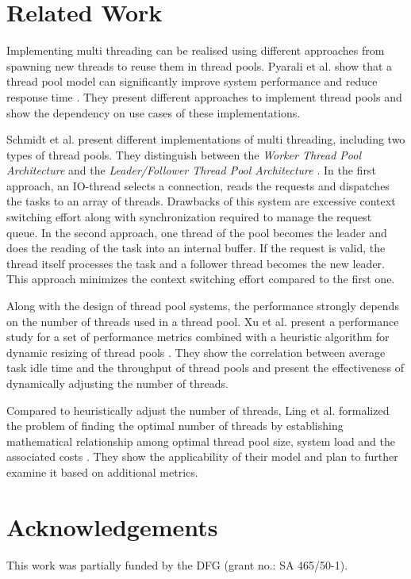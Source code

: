 \documentclass[conference]{IEEEtran}
\begin{document}
\section{Related Work}
Implementing multi threading can be realised using different approaches from spawning new threads to reuse them in thread pools. Pyarali et al. show that a thread pool model can significantly improve system performance and reduce response time \cite{pyarali2001evaluating}. They present different approaches to implement thread pools and show the dependency on use cases of these implementations.

Schmidt et al. present different implementations of multi threading, including two types of thread pools. They distinguish between the \emph{Worker Thread Pool Architecture} and the \emph{Leader/Follower Thread Pool Architecture} \cite{schmidt1998evaluating}. In the first approach, an IO-thread selects a connection, reads the requests and dispatches the tasks to an array of threads. Drawbacks of this system are excessive context switching effort along with synchronization required to manage the request queue. In the second approach, one thread of the pool becomes the leader and does the reading of the task into an internal buffer. If the request is valid, the thread itself processes the task and a follower thread becomes the new leader. This approach minimizes the context switching effort compared to the first one.

Along with the design of thread pool systems, the performance strongly depends on the number of threads used in a thread pool. Xu et al. present a performance study for a set of performance metrics combined with a heuristic algorithm for dynamic resizing of thread pools \cite{xu2004performance}. They show the correlation between average task idle time and the throughput of thread pools and present the effectiveness of dynamically adjusting the number of threads.

Compared to heuristically adjust the number of threads, Ling et al. formalized the problem of finding the optimal number of threads by establishing mathematical relationship among optimal thread pool size, system load and the associated costs \cite{ling2000analysis}. They show the applicability of their model and plan to further examine it based on additional metrics.

\section{Acknowledgements}
This work was partially funded by the DFG (grant no.: SA 465/50-1).
\end{document}
